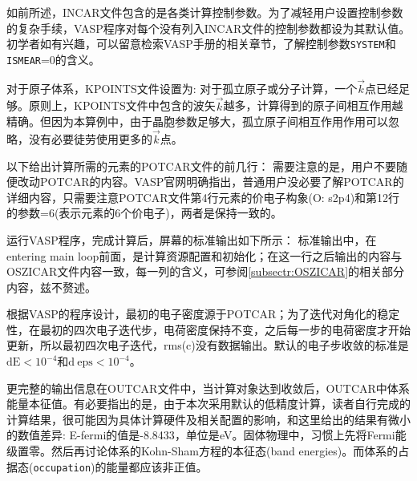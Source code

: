 如前所述，\textrm{INCAR}文件包含的是各类计算控制参数。为了减轻用户设置控制参数的复杂手续，\textrm{VASP}程序对每个没有列入\textrm{INCAR}文件的控制参数都设为其默认值。
{\fontsize{8.2pt}{6.2pt}\selectfont{
}}
初学者如有兴趣，可以留意检索\textrm{VASP}手册的相关章节，了解控制参数\texttt{SYSTEM}和\texttt{ISMEAR}=0的含义。

对于原子体系，\textrm{KPOINTS}文件设置为:
{\fontsize{8.2pt}{6.2pt}\selectfont{
}}
对于孤立原子或分子计算，一个$\vec k$点已经足够。原则上，\textrm{KPOINTS}文件中包含的波矢$\vec k$越多，计算得到的原子间相互作用越精确。但因为本算例中，由于晶胞参数足够大，孤立原子间相互作用作用可以忽略，没有必要徒劳使用更多的$\vec k$点。

以下给出计算所需的元素的\textrm{POTCAR}文件的前几行：
{\fontsize{8.2pt}{6.2pt}\selectfont{
}}
需要注意的是，用户不要随便改动\textrm{POTCAR}的内容。\textrm{VASP}官网明确指出，普通用户没必要了解\textrm{POTCAR}的详细内容，只需要注意\textrm{POTCAR}文件第4行元素的价电子构象(\textrm{O: s2p4})和第12行的参数=6(表示元素的6个价电子)，两者是保持一致的。

运行\textrm{VASP}程序，完成计算后，屏幕的标准输出如下所示：
{\fontsize{8.2pt}{6.2pt}\selectfont{
}}
标准输出中，在\textrm{entering main loop}前面，是计算资源配置和初始化；在这一行之后输出的内容与\textrm{OSZICAR}文件内容一致，每一列的含义，可参阅\ref{subsectr:OSZICAR}的相关部分内容，兹不赘述。

根据\textrm{VASP}的程序设计，最初的电子密度源于\textrm{POTCAR}；为了迭代对角化的稳定性，在最初的四次电子迭代步，电荷密度保持不变，之后每一步的电荷密度才开始更新，所以最初四次电子迭代，\textrm{rms(c)}没有数据输出。默认的电子步收敛的标准是$\mathrm{dE}<10^{-4}$和$\mathrm{d~eps}<10^{-4}$。

更完整的输出信息在\textrm{OUTCAR}文件中，当计算对象达到收敛后，\textrm{OUTCAR}中体系能量本征值。有必要指出的是，由于本次采用默认的低精度计算，读者自行完成的计算结果，很可能因为具体计算硬件及相关配置的影响，和这里给出的结果有微小的数值差异:
{\fontsize{8.2pt}{6.2pt}\selectfont{
}}
\textrm{E-fermi}的值是\textrm{-8.8433}，单位是\textrm{eV}。固体物理中，习惯上先将\textrm{Fermi}能级置零。然后再讨论体系的\textrm{Kohn-Sham}方程的本征态(\textrm{band energies})。而体系的占据态(\texttt{occupation})的能量都应该非正值。

